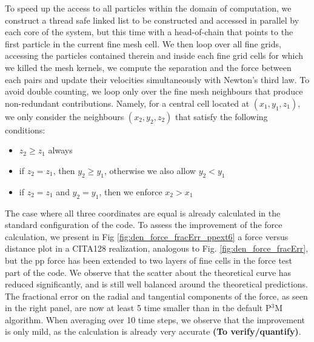  To speed up the access to all particles within the domain of computation, we construct a thread safe linked list
 to be constructed and accessed in parallel by each core of the system, but this time with a head-of-chain that points to the first particle in the current fine mesh cell. We then loop over all fine grids, accessing the particles contained therein and inside each fine grid cells for which we killed the mesh kernels,
 we compute the separation and the force between each pairs and update their velocities simultaneously with Newton's third law. 
 To avoid double counting, we loop only over the fine mesh neighbours that produce non-redundant contributions. Namely, for a central cell located at 
 $(x_1, y_1, z_1)$, we only consider the neighbours $(x_2, y_2, z_2)$ that satisfy the following conditions:
 \begin{itemize}
 \item{$z_2 \ge z_1$ always}
 \item{if $z_2 = z_1$, then $y_2 \ge y_1$, otherwise we also allow $y_2 < y_1$} 
 \item{if $z_2 = z_1$ and $y_2 = y_1$, then we enforce $x_2 > x_1$}
 \end{itemize}
 The case where all three coordinates are equal is already calculated in the standard configuration of the code.
 To assess the improvement of the force calculation, we present in Fig \ref{fig:den_force_fracErr_ppext6} a force versus distance
 plot in a CITA128 realization, analogous to Fig. \ref{fig:den_force_fracErr}, but the pp force has been extended to  two layers of fine cells
 in the force test part of the code. 
 We observe that the scatter about the theoretical curve has reduced significantly, and is still well balanced around the theoretical predictions.
 The fractional error on the radial and tangential components of the force, as seen in the right panel,
 are now at least 5 time smaller than in the default P$^{3}$M algorithm.
 When averaging over 10 time steps, we observe that the improvement is only mild, as the calculation is already very accurate {\bf (To verify/quantify)}. 
 
